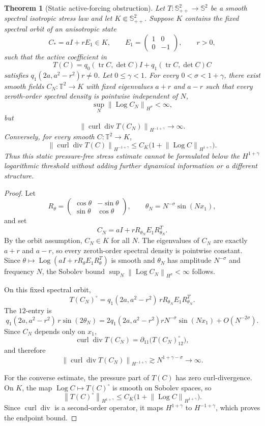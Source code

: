 \documentclass[11pt]{article}
\newtheorem{theorem}{Theorem}[section]
\newcommand{\T}{\mathbb T}
\newcommand{\Spp}{\mathbb S_{++}}
\newcommand{\Sym}{\mathbb S}
\newcommand{\tr}{\operatorname{tr}}
\newcommand{\divv}{\operatorname{div}}
\newcommand{\curl}{\operatorname{curl}}
\newcommand{\Log}{\operatorname{Log}}
\newcommand{\norm}[1]{\left\lVert #1\right\rVert}
\begin{document}
\begin{theorem}[Static active-forcing obstruction]
\label{thm:active-threshold}
Let \(T:\Spp^2\to\Sym^2\) be a smooth spectral isotropic stress law and let
\(K\Subset\Spp^2\).  Suppose \(K\) contains the fixed spectral orbit of an
anisotropic state
\[
  C_*=aI+rE_1\in K,\qquad
  E_1=\begin{pmatrix}1&0\\0&-1\end{pmatrix},\qquad r>0,
\]
such that the active coefficient in
\[
  T(C)=q_0(\tr C,\det C)I+q_1(\tr C,\det C)C
\]
satisfies \(q_1(2a,a^2-r^2)r\ne0\).  Let \(0\le\gamma<1\).  For every
\(0<\sigma<1+\gamma\), there exist smooth fields \(C_N:\T^2\to K\) with fixed
eigenvalues \(a+r\) and \(a-r\) such that every zeroth-order spectral density
is pointwise independent of \(N\),
\[
  \sup_N\norm{\Log C_N}_{H^\sigma}<\infty,
\]
but
\[
  \norm{\curl\divv T(C_N)}_{H^{-1+\gamma}}\to\infty .
\]
Conversely, for every smooth \(C:\T^2\to K\),
\[
  \norm{\curl\divv T(C)}_{H^{-1+\gamma}}
  \le C_K\bigl(1+\norm{\Log C}_{H^{1+\gamma}}\bigr).
\]
Thus this static pressure-free stress estimate cannot be formulated below the
\(H^{1+\gamma}\) logarithmic threshold without adding further dynamical
information or a different structure.
\end{theorem}

\begin{proof}
Let
\[
  R_\theta=\begin{pmatrix}\cos\theta&-\sin\theta\\
  \sin\theta&\cos\theta\end{pmatrix},\qquad
  \theta_N=N^{-\sigma}\sin(Nx_1),
\]
and set
\[
  C_N=aI+rR_{\theta_N}E_1R_{\theta_N}^T .
\]
By the orbit assumption, \(C_N\in K\) for all \(N\).  The eigenvalues of
\(C_N\) are exactly \(a+r\) and \(a-r\), so every zeroth-order spectral density
is pointwise constant.  Since
\(\theta\mapsto\Log(aI+rR_\theta E_1R_\theta^T)\) is smooth and
\(\theta_N\) has amplitude \(N^{-\sigma}\) and frequency \(N\), the Sobolev
bound \(\sup_N\norm{\Log C_N}_{H^\sigma}<\infty\) follows.

On this fixed spectral orbit,
\[
  T(C_N)^\circ=q_1(2a,a^2-r^2)\,rR_{\theta_N}E_1R_{\theta_N}^T .
\]
The \(12\)-entry is
\[
  q_1(2a,a^2-r^2)\,r\sin(2\theta_N)
  =2q_1(2a,a^2-r^2)rN^{-\sigma}\sin(Nx_1)+O(N^{-2\sigma}).
\]
Since \(C_N\) depends only on \(x_1\),
\[
  \curl\divv T(C_N)
  =\partial_{11}\bigl(T(C_N)^\circ_{12}\bigr),
\]
and therefore
\[
  \norm{\curl\divv T(C_N)}_{H^{-1+\gamma}}
  \gtrsim N^{1+\gamma-\sigma}\to\infty .
\]

For the converse estimate, the pressure part of \(T(C)\) has zero curl-divergence.
On \(K\), the map \(\Log C\mapsto T(C)^\circ\) is smooth on Sobolev spaces, so
\[
  \norm{T(C)^\circ}_{H^{1+\gamma}}
  \le C_K\bigl(1+\norm{\Log C}_{H^{1+\gamma}}\bigr).
\]
Since \(\curl\divv\) is a second-order operator, it maps
\(H^{1+\gamma}\) to \(H^{-1+\gamma}\), which proves the endpoint bound.
\end{proof}
\end{document}
